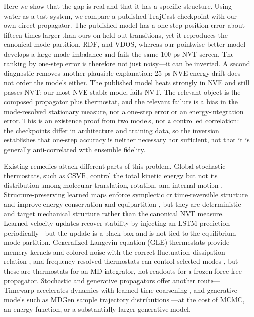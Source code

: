 Here we show that the gap is real and that it has a specific structure. Using water as a test
system, we compare a published TrajCast checkpoint with our own direct propagator. The published
model has a one-step position error about fifteen times larger than ours on held-out transitions,
yet it reproduces the canonical mode partition, RDF, and VDOS, whereas our pointwise-better model
develops a large mode imbalance and fails the same 100 ps NVT screen. The ranking by one-step
error is therefore not just noisy---it can be inverted. A second diagnostic removes another
plausible explanation: 25 ps NVE energy drift does not order the models either. The published
model heats strongly in NVE and still passes NVT; our most NVE-stable model fails NVT. The
relevant object is the composed propagator plus thermostat, and the relevant failure is a bias in
the mode-resolved stationary measure, not a one-step error or an energy-integration error. This
is an existence proof from two models, not a controlled correlation: the checkpoints differ in
architecture and training data, so the inversion establishes that one-step accuracy is neither
necessary nor sufficient, not that it is generally anti-correlated with ensemble fidelity.

Existing remedies attack different parts of this problem. Global stochastic thermostats, such as
CSVR, control the total kinetic energy but not its distribution among molecular translation,
rotation, and internal motion \cite{csvr}. Structure-preserving learned maps enforce symplectic or
time-reversible structure and improve energy conservation and equipartition \cite{bigi_action},
but they are deterministic and target mechanical structure rather than the canonical NVT measure.
Learned velocity updates recover stability by injecting an LSTM prediction periodically
\cite{mamd}, but the update is a black box and is not tied to the equilibrium mode partition.
Generalized Langevin equation (GLE) thermostats provide memory kernels and colored noise with the
correct fluctuation--dissipation relation \cite{ceriotti_prl,ceriotti_jctc}, and
frequency-resolved thermostats can control selected modes \cite{zpe_thermostat}, but these are
thermostats for an MD integrator, not readouts for a frozen force-free propagator. Stochastic and
generative propagators offer another route---Timewarp accelerates dynamics with learned
time-coarsening \cite{timewarp}, and generative models such as MDGen sample trajectory
distributions \cite{mdgen}---at the cost of MCMC, an energy function, or a substantially larger
generative model.


